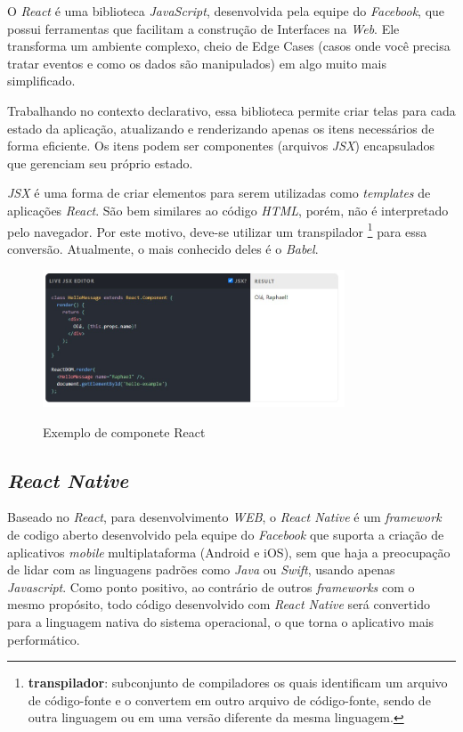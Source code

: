 O \textit{React} é uma biblioteca \textit{JavaScript}, desenvolvida pela equipe do \textit{Facebook}, que possui ferramentas que facilitam a construção de Interfaces na \textit{Web}. Ele transforma um ambiente complexo, cheio de Edge Cases (casos onde você precisa tratar eventos e como os dados são manipulados) em algo muito mais simplificado.

Trabalhando no contexto declarativo, essa biblioteca permite criar telas para cada estado da aplicação, atualizando e renderizando apenas os itens necessários de forma eficiente. Os itens podem ser componentes (arquivos \textit{JSX}) encapsulados que gerenciam seu próprio estado.

\textit{JSX} é uma forma de criar elementos para serem utilizadas como \textit{templates} de aplicações \textit{React}. São bem similares ao código \textit{HTML}, porém, não é interpretado pelo navegador. Por este motivo, deve-se utilizar um transpilador \footnote{\textbf{transpilador}: subconjunto de compiladores os quais identificam um arquivo de código-fonte e o convertem em outro arquivo de código-fonte, sendo de outra linguagem ou em uma versão diferente da mesma linguagem.} para essa conversão. Atualmente, o mais conhecido deles é o \textit{Babel}.

\begin{figure}[H]
	\centering
	\caption{Exemplo de componete React}
	\includegraphics[width=0.8\textwidth]{figuras/exemplo_react.jpg}
	\label{fig:react_code}
\end{figure} 


\subsection{\textit{React Native}}

Baseado no \textit{React}, para desenvolvimento \textit{WEB}, o \textit{React Native} é um \textit{framework} de codigo aberto desenvolvido pela equipe do \textit{Facebook} que suporta a criação de aplicativos \textit{mobile} multiplataforma (Android e iOS), sem que haja a preocupação de lidar com as linguagens padrões como \textit{Java} ou \textit{Swift}, usando apenas \textit{Javascript}. Como ponto positivo, ao contrário de outros \textit{frameworks} com o mesmo propósito, todo código desenvolvido com \textit{React Native} será convertido para a linguagem nativa do sistema operacional, o que torna o aplicativo mais performático.

